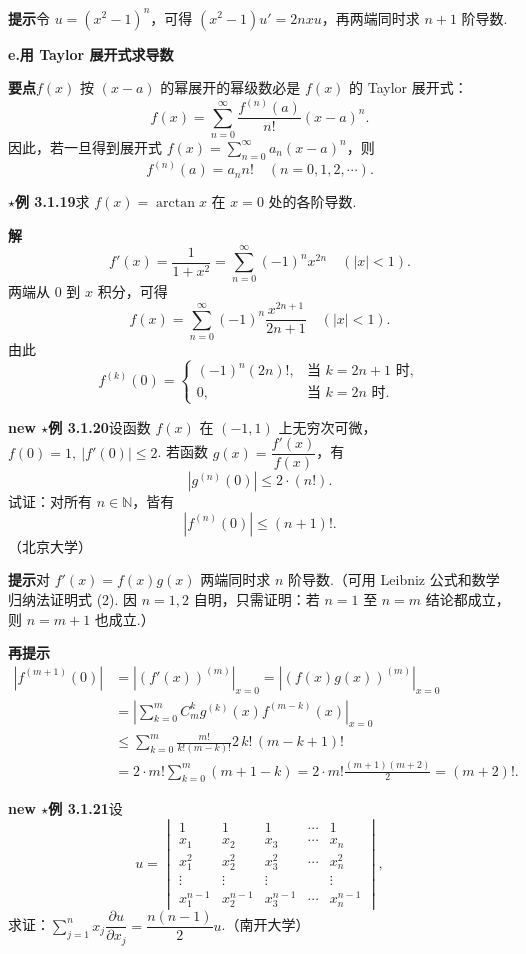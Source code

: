 \documentclass[UTF8,12pt,a4paper,fontset=fandol]{ctexart}
\begin{document}
\noindent\textbf{提示}\quad 令 $u=(x^2-1)^n$，可得 $(x^2-1)u'=2nxu$，再两端同时求 $n+1$ 阶导数.

\noindent\textbf{e.\quad 用 Taylor 展开式求导数}

\noindent\textbf{要点}\quad $f(x)$ 按 $(x-a)$ 的幂展开的幂级数必是 $f(x)$ 的 Taylor 展开式：
\[
  f(x)=\sum_{n=0}^\infty\frac{f^{(n)}(a)}{n!}(x-a)^n.
\]
因此，若一旦得到展开式 $f(x)=\sum\limits_{n=0}^\infty a_n(x-a)^n$，则
\[
  f^{(n)}(a)=a_n n!\quad(n=0,1,2,\cdots).
\]

\noindent\textbf{$\star$例 3.1.19}\quad 求 $f(x)=\arctan x$ 在 $x=0$ 处的各阶导数.

\noindent\textbf{解}\quad
\[
  f'(x)=\frac1{1+x^2}=\sum_{n=0}^\infty(-1)^n x^{2n}\quad(|x|<1).
\]
两端从 $0$ 到 $x$ 积分，可得
\[
  f(x)=\sum_{n=0}^\infty(-1)^n\frac{x^{2n+1}}{2n+1}\quad(|x|<1).
\]
由此
\[
f^{(k)}(0)=
\begin{cases}
(-1)^n(2n)!, & \text{当 }k=2n+1\text{ 时},\\
0, & \text{当 }k=2n\text{ 时}.
\end{cases}
\]

\noindent\textbf{new $\star$例 3.1.20}\quad 设函数 $f(x)$ 在 $(-1,1)$ 上无穷次可微，$f(0)=1,\ |f'(0)|\le2$. 若函数 $g(x)=\dfrac{f'(x)}{f(x)}$，有
\begin{equation}
  |g^{(n)}(0)|\le2\cdot(n!).
\tag{1}
\end{equation}
试证：对所有 $n\in\mathbb N$，皆有
\begin{equation}
  |f^{(n)}(0)|\le(n+1)!.
\tag{2}
\end{equation}
（北京大学）

\noindent\textbf{提示}\quad 对 $f'(x)=f(x)g(x)$ 两端同时求 $n$ 阶导数.（可用 Leibniz 公式和数学归纳法证明式 (2). 因 $n=1,2$ 自明，只需证明：若 $n=1$ 至 $n=m$ 结论都成立，则 $n=m+1$ 也成立.）

\noindent\textbf{再提示}\quad
\[
\begin{aligned}
|f^{(m+1)}(0)|
&=|(f'(x))^{(m)}|_{x=0}
=|(f(x)g(x))^{(m)}|_{x=0}\\
&=\left|\sum_{k=0}^m C_m^k g^{(k)}(x)f^{(m-k)}(x)\right|_{x=0}\\
&\le\sum_{k=0}^m\frac{m!}{k!(m-k)!}2\,k!\,(m-k+1)!\\
&=2\cdot m!\sum_{k=0}^m(m+1-k)
=2\cdot m!\frac{(m+1)(m+2)}2=(m+2)!.
\end{aligned}
\]

\noindent\textbf{new $\star$例 3.1.21}\quad 设
\begin{equation}
u=
\begin{vmatrix}
1&1&1&\cdots&1\\
x_1&x_2&x_3&\cdots&x_n\\
x_1^2&x_2^2&x_3^2&\cdots&x_n^2\\
\vdots&\vdots&\vdots& &\vdots\\
x_1^{n-1}&x_2^{n-1}&x_3^{n-1}&\cdots&x_n^{n-1}
\end{vmatrix},
\tag{1}
\end{equation}
求证：$\sum\limits_{j=1}^n x_j\dfrac{\partial u}{\partial x_j}=\dfrac{n(n-1)}2u$.（南开大学）
\end{document}
